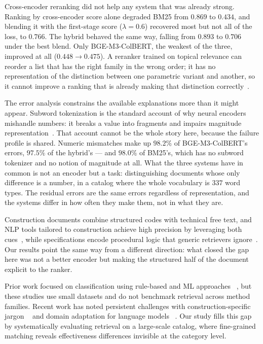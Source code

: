 \documentclass[preprint,12pt]{elsarticle}
\begin{document}
Cross-encoder reranking did not help any system that was already strong. Ranking by cross-encoder score alone degraded BM25 from $0.869$ to $0.434$, and blending it with the first-stage score ($\lambda=0.6$) recovered most but not all of the loss, to $0.766$. The hybrid behaved the same way, falling from $0.893$ to $0.706$ under the best blend. Only BGE-M3-ColBERT, the weakest of the three, improved at all ($0.448 \to 0.475$). A reranker trained on topical relevance can reorder a list that has the right family in the wrong order; it has no representation of the distinction between one parametric variant and another, so it cannot improve a ranking that is already making that distinction correctly~\cite{nogueiraDocumentRankingPretrained2020, zhuang2023rankt5}.

The error analysis constrains the available explanations more than it might appear. Subword tokenization is the standard account of why neural encoders mishandle numbers: it breaks a value into fragments and impairs magnitude representation~\cite{wallace2019nlp}. That account cannot be the whole story here, because the failure profile is shared. Numeric mismatches make up $98.2\%$ of BGE-M3-ColBERT's errors, $97.5\%$ of the hybrid's --- and $98.0\%$ of BM25's, which has no subword tokenizer and no notion of magnitude at all. What the three systems have in common is not an encoder but a task: distinguishing documents whose only difference is a number, in a catalog where the whole vocabulary is $337$ word types. The residual errors are the same errors regardless of representation, and the systems differ in how often they make them, not in what they are.

Construction documents combine structured codes with technical free text, and NLP tools tailored to construction achieve high precision by leveraging both cues~\cite{AKANBI2021}, while specifications encode procedural logic that generic retrievers ignore~\cite{LI2023}. Our results point the same way from a different direction: what closed the gap here was not a better encoder but making the structured half of the document explicit to the ranker.

Prior work focused on classification using rule-based and ML approaches ~\cite{caldasAutomatingHierarchicalDocument2003, natural_wu_2022, martinez-rojasApproachAutomaticClassification2015, role_martnezrojas_2016, martinez-rojasUsingClassificationTechniques2018}, but these studies use small datasets and do not benchmark retrieval across method families. Recent work has noted persistent challenges with construction-specific jargon ~\cite{natural_wu_2022} and domain adaptation for language models ~\cite{chungComparingNaturalLanguage2023}. Our study fills this gap by systematically evaluating retrieval on a large-scale catalog, where fine-grained matching reveals effectiveness differences invisible at the category level.
\end{document}
